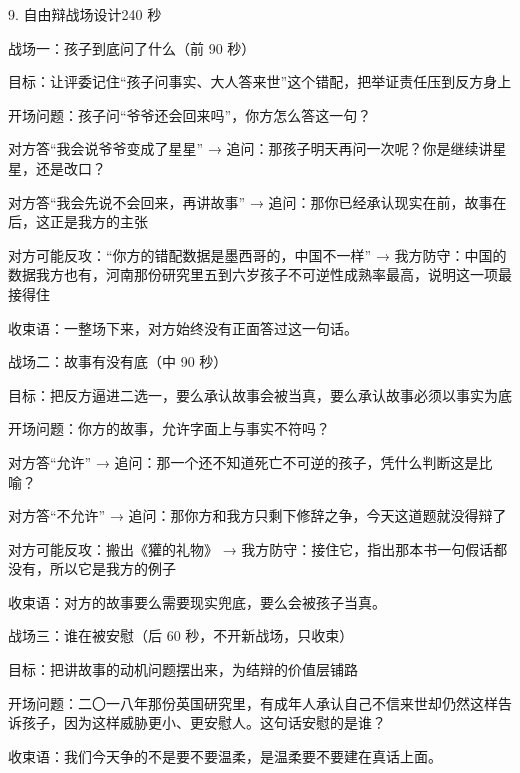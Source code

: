 \documentclass[script,pro]{debate}
\begin{document}
\begin{stage}{9. 自由辩战场设计}{240 秒}
\begin{battleground}{战场一：孩子到底问了什么（前 90 秒）}
\begin{bullets}
\item 目标：让评委记住“孩子问事实、大人答来世”这个错配，把举证责任压到反方身上
\item 开场问题：孩子问“爷爷还会回来吗”，你方怎么答这一句？
\item 对方答“我会说爷爷变成了星星” → 追问：那孩子明天再问一次呢？你是继续讲星星，还是改口？
\item 对方答“我会先说不会回来，再讲故事” → 追问：那你已经承认现实在前，故事在后，这正是我方的主张
\item 对方可能反攻：“你方的错配数据是墨西哥的，中国不一样” → 我方防守：中国的数据我方也有，河南那份研究里五到六岁孩子不可逆性成熟率最高，说明这一项最接得住
\item 收束语：一整场下来，对方始终没有正面答过这一句话。
\end{bullets}
\end{battleground}
\begin{battleground}{战场二：故事有没有底（中 90 秒）}
\begin{bullets}
\item 目标：把反方逼进二选一，要么承认故事会被当真，要么承认故事必须以事实为底
\item 开场问题：你方的故事，允许字面上与事实不符吗？
\item 对方答“允许” → 追问：那一个还不知道死亡不可逆的孩子，凭什么判断这是比喻？
\item 对方答“不允许” → 追问：那你方和我方只剩下修辞之争，今天这道题就没得辩了
\item 对方可能反攻：搬出《獾的礼物》 → 我方防守：接住它，指出那本书一句假话都没有，所以它是我方的例子
\item 收束语：对方的故事要么需要现实兜底，要么会被孩子当真。
\end{bullets}
\end{battleground}
\begin{battleground}{战场三：谁在被安慰（后 60 秒，不开新战场，只收束）}
\begin{bullets}
\item 目标：把讲故事的动机问题摆出来，为结辩的价值层铺路
\item 开场问题：二〇一八年那份英国研究里，有成年人承认自己不信来世却仍然这样告诉孩子，因为这样威胁更小、更安慰人。这句话安慰的是谁？
\item 收束语：我们今天争的不是要不要温柔，是温柔要不要建在真话上面。

\end{bullets}
\end{battleground}
\end{stage}
\end{document}

